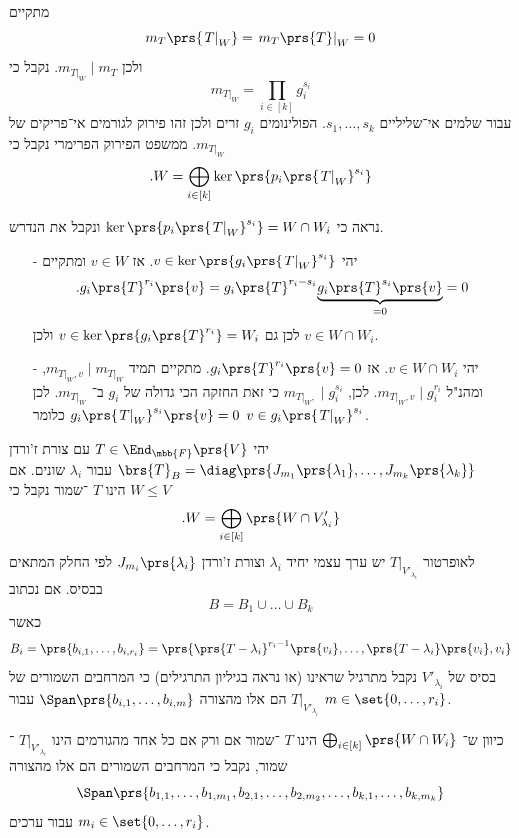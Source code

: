 \documentclass[a4paper,10pt,twoside,openany]{book}
\begin{document}
\begin{solution}
מתקיים
\[m_T\prs{\left. T \right|_W} = \left. m_T\prs{T} \right|_W = 0\]
ולכן
$m_{\left. T \right|_W} \mid m_T$.
נקבל כי
\[m_{\left. T \right|_W} = \prod_{i \in [k]} g_i^{s_i}\]
עבור שלמים אי־שליליים
$s_1, \ldots, s_k$.
הפולינומים
$g_i$
זרים ולכן זהו פירוק לגורמים אי־פריקים של
$m_{\left. T \right|_W}$.
ממשפט הפירוק הפרימרי נקבל כי
\[\text{.} W = \bigoplus_{i \in [k]} \ker\prs{p_i\prs{\left. T \right|_W}^{s_i}}\]

נראה כי
$\ker\prs{p_i\prs{\left. T \right|_W}^{s_i}} = W \cap W_i$
ונקבל את הנדרש.

\begin{itemize}
\item[-]
יהי
$v \in \ker\prs{g_i\prs{\left. T \right|_W}^{s_i}}$.
אז
$v \in W$
ומתקיים
\[\text{.} g_i\prs{T}^{r_i}\prs{v} = g_i\prs{T}^{r_i - s_i} \underset{=0}{\underbrace{g_i\prs{T}^{s_i}\prs{v}}} = 0\]
לכן גם
$v \in \ker\prs{g_i\prs{T}^{r_i}} = W_i$
ולכן
$v \in W \cap W_i$.

\item[-]
יהי
$v \in W \cap W_i$.
אז
$g_i\prs{T}^{r_i}\prs{v} = 0$.
מתקיים תמיד
$m_{\left. T \right|_W, v} \mid m_{\left. T \right|_W}$,
ומהנ"ל
$m_{\left. T \right|_W, v} \mid g_i^{r_i}$.
לכן,
$m_{\left. T \right|_W, } \mid g_i^{s_i}$
כי זאת החזקה הכי גדולה של
$g_i$
ב־%
$m_{\left. T \right|_W}$.
לכן
$g_i\prs{\left. T \right|_W}^{s_i}\prs{v} = 0$
כלומר
$v \in g_i\prs{\left. T \right|_W}^{s_i}$.
\end{itemize}
\end{solution}

\begin{corollary}
יהי
$T \in \End_{\mbb{F}}\prs{V}$
עם צורת ז'ורדן
$\brs{T}_B = \diag\prs{J_{m_1}\prs{\lambda_1}, \ldots, J_{m_k}\prs{\lambda_k}}$
עבור
$\lambda_i$
שונים.
אם
$W \leq V$
הינו
$T$%
־שמור נקבל כי
\[\text{.} W = \bigoplus_{i \in [k]} \prs{W \cap V'_{\lambda_i}}\]
לאופרטור
$\left. T \right|_{V'_{\lambda_i}}$
יש ערך עצמי יחיד
$\lambda_i$
וצורת ז'ורדן
$J_{m_i}\prs{\lambda_i}$
לפי החלק המתאים בבסיס. אם נכתוב
\[B = B_1 \cup \ldots \cup B_k\]
כאשר
\[B_i = \prs{b_{i,1}, \ldots, b_{i,r_i}} = \prs{\prs{T - \lambda_i}^{r_i - 1}\prs{v_i}, \ldots, \prs{T - \lambda_i}\prs{v_i}, v_i}\]
בסיס של
$V'_{\lambda_i}$
נקבל מתרגיל שראינו (או נראה בגיליון התרגילים) כי המרחבים השמורים של
$\left. T \right|_{V'_{\lambda_i}}$
הם אלו מהצורה
$\Span\prs{b_{i,1}, \ldots, b_{i,m}}$
עבור
$m \in \set{0, \ldots, r_i}$.

כיוון ש־%
$\bigoplus_{i \in [k]} \prs{W \cap W_i}$
הינו
$T$%
־שמור אם ורק אם כל אחד מהגורמים הינו
$\left. T \right|_{V'_{\lambda_i}}$%
־שמור, נקבל כי המרחבים השמורים הם אלו מהצורה
\[\Span\prs{b_{1,1}, \ldots, b_{1,m_1}, b_{2,1}, \ldots, b_{2, m_2}, \ldots, b_{k,1}, \ldots, b_{k,m_k}}\]
עבור ערכים
$m_i \in \set{0, \ldots, r_i}$.
\end{corollary}
\end{document}
